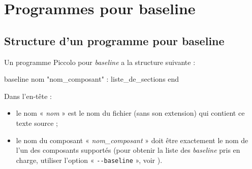 

\chapter{Programmes pour baseline}

\thispagestyle{empty}




\section{Structure d’un programme pour baseline}

Un programme Piccolo pour \emph{baseline} a la structure suivante :

\begin{piccolo}
baseline nom "nom_composant" :
  liste_de_sections
end
\end{piccolo}


Dans l’en-tête :
\begin{itemize}
  \item le nom « \emph{nom} » est le nom du fichier (sans son extension) qui contient ce texte source ;
  \item le nom du composant « \emph{nom\_composant} » doit être exactement le nom de l’un des composants supportés (pour obtenir la liste des \emph{baseline} pris en charge, utiliser l’option « \texttt{-{}-baseline} », voir ).
\end{itemize}


